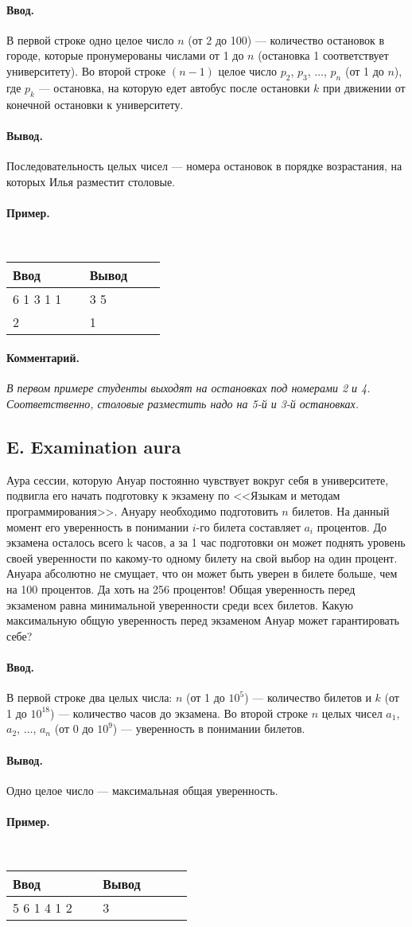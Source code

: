 \documentclass[12pt, a4paper]{article}
\newcommand{\informat}[1]
{
	\paragraph{Ввод.\\} #1
}
\newcommand{\outformat}[1]
{
	\paragraph{Вывод.\\} #1
}
\newcommand{\example}[2]
{
	\paragraph{Пример.\\}
	{\tt
	\begin{tabular}{|p{0.4\linewidth}|p{0.4\linewidth}|}
	\hline
	Ввод & Вывод \\
	\hline
	#1 & #2		\\
	\hline
	\end{tabular}
	}
}
\newcommand{\examplee}[4]
{
	\paragraph{Пример.\\}
	{\tt
	\begin{tabular}{|p{0.4\linewidth}|p{0.4\linewidth}|}
	\hline
	Ввод 	& Вывод  	\\
	\hline
	#1 		& #2 		\\
	\hline
	#3		& #4		\\
	\hline
	\end{tabular}
	}
}
\newcommand{\excomm}[1]
{
	\paragraph{Комментарий. \\}
	\textit{#1}
}
\begin{document}
\informat{В первой строке одно целое число $n$ (от 2 до 100) --- количество остановок в городе, которые пронумерованы числами от 1 до $n$ (остановка 1 соответствует университету). Во второй строке $(n-1)$ целое число $p_2$, $p_3$, $\dots$, $p_n$ (от 1 до $n$), где $p_k$ --- остановка, на которую едет автобус после остановки $k$ при движении от конечной остановки к университету.}
 
\outformat{Последовательность целых чисел --- номера остановок в порядке возрастания, на которых Илья разместит столовые.}

\examplee{6 \newline 5 1 3 1 1}{3 5}{2 \newline 1}{1}

\excomm{В первом примере студенты выходят на остановках под номерами 2 и 4. Соответственно, столовые разместить надо на 5-й и 3-й остановках.}



\subsection*{E. Examination aura}

Аура сессии, которую Ануар постоянно чувствует вокруг себя в университете, подвигла его начать подготовку к экзамену по <<Языкам и методам программирования>>. Ануару необходимо подготовить $n$ билетов. На данный момент его уверенность в понимании $i$-го билета составляет $a_i$ процентов. До экзамена осталось всего k часов, а за 1 час подготовки он может поднять уровень своей уверенности по какому-то одному билету на свой выбор на один процент. Ануара абсолютно не смущает, что он может быть уверен в билете больше, чем на 100 процентов. Да хоть на 256 процентов! Общая уверенность перед экзаменом равна минимальной уверенности среди всех билетов. Какую максимальную общую уверенность перед экзаменом Ануар может гарантировать себе? 
 
\informat{В первой строке два целых числа: $n$ (от 1 до $10^5$) --- количество билетов и $k$ (от 1 до $10^{18}$) --- количество часов до экзамена. \newline
Во второй строке $n$ целых чисел $a_1$, $a_2$, $\dots$, $a_n$ (от 0 до $10^9$) --- уверенность в понимании билетов.}

\outformat{Одно целое число --- максимальная общая уверенность.}
 
\example{5 6 \newline 5 1 4 1 2}{3}
 
\end{document}

